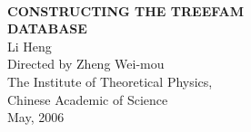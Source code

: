 

\newcommand{\lhchild}{\mathrm{chi}}
\newcommand{\lhparent}{\mathrm{par}}
\newcommand{\lhlca}{\mathrm{lca}}
\newcommand{\lhopt}{\mathrm{opt}}
\newcommand{\lhloss}{\mathrm{loss}}
\newcommand{\lhspace}{\hspace{20pt}}

\usepackage{bioinformatics}






\begin{titlepage}
\thispagestyle{empty}
\begin{center}
\begin{verbatim}
  
\end{verbatim}
\vspace{5cm}
{\bf\huge CONSTRUCTING THE TREEFAM}\\
\vspace{0.5cm}
{\bf\huge DATABASE}\\
\vspace{4cm}
{\LARGE Li Heng\\
\vspace{0.2cm}
Directed by Zheng Wei-mou \\
\vspace{0.2cm}
The Institute of Theoretical Physics,\\
Chinese Academic of Science\\
\vspace{3cm}
May, 2006}\\
\end{center}
\end{titlepage}

\setcounter{page}{1}
